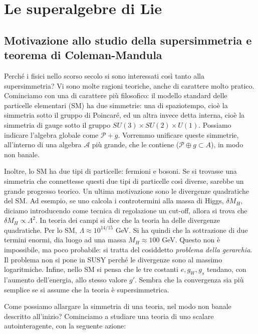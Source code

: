 \documentclass{report}
\begin{document}

\chapter{Le superalgebre di Lie}

\section{Motivazione allo studio della supersimmetria e teorema di Coleman-Mandula}

Perché i fisici nello scorso secolo si sono interessati così tanto alla supersimmetria? Vi sono molte ragioni teoriche, anche di carattere molto pratico. Cominciamo con una di carattere più filosofico: il modello standard delle particelle elementari (SM) ha due simmetrie: una di spaziotempo, cioè la simmetria sotto il gruppo di Poincaré, ed un altra invece detta interna, cioè la simmetria di gauge sotto il gruppo \(SU(3)\times SU(2)\times U(1)\). Possiamo indicare l'algebra globale come \(\mathcal{P} + g\). Vorremmo unificare queste simmetrie, all'interno di una algebra \(\mathcal{A}\) più grande, che le contiene (\(\mathcal{P} \oplus g \subset A\)), in modo non banale.  

Inoltre, lo SM ha due tipi di particelle: fermioni e bosoni. Se si trovasse una simmetria che connettesse questi due tipi di particelle così diverse, sarebbe un grande progresso teorico. Un ultima motivazione sono le divergenze quadratiche del SM. Ad esempio, se uno calcola i controtermini alla massa di Higgs, \(\delta M_H\), diciamo introducendo come tecnica di regolazione un cut-off, allora si trova che \(\delta M_H \propto \Lambda^2\). In teoria dei campi si dice che la teoria ha delle divergenze quadratiche. Per lo SM, \(\Lambda \approx 10^{14/15}\) GeV. Si ha quindi che la sottrazione di due termini enormi, dia luogo ad una massa \(M_H \approx 100\) GeV. Questo non è impossibile, ma poco probabile: si tratta del cosiddetto \emph{problema della gerarchia}. Il problema non si pone in SUSY perché le divergenze sono al massimo logaritmiche. Infine, nello SM si pensa che le tre costanti \(e, g_W, g_s\) tendano, con l'aumento dell'energia, allo stesso valore \(g'\). Sembra che la convergenza sia più semplice se si assume che la teoria è supersimmetrica. 

Come possiamo allargare la simmetria di una teoria, nel modo non banale descritto all'inizio? Cominciamo a studiare una teoria di uno scalare autointeragente, con la seguente azione: 
\end{document}
